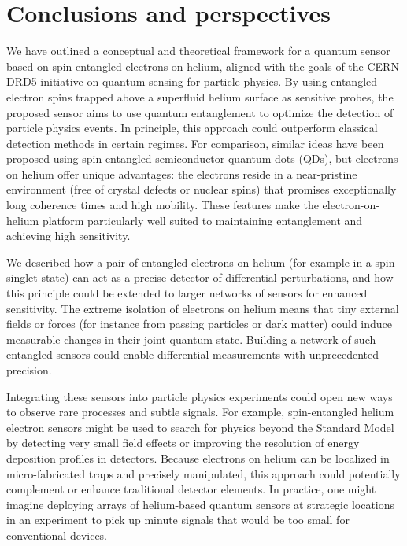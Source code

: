 \documentclass[fleqn,10pt]{wlscirep}
\begin{document}
\section{Conclusions and perspectives}

We have outlined a conceptual and theoretical framework for a quantum sensor based on spin-entangled electrons on helium, aligned with the goals of the CERN DRD5 initiative \cite{drd52024} on quantum sensing for particle physics. By using entangled electron spins trapped above a superfluid helium surface as sensitive probes, the proposed sensor aims to use quantum entanglement to optimize the detection of particle physics events. In principle, this approach could outperform classical detection methods in certain regimes.  For comparison, similar ideas have been proposed using spin-entangled semiconductor quantum dots (QDs), but electrons on helium offer unique advantages: the electrons reside in a near-pristine environment (free of crystal defects or nuclear spins) that promises exceptionally long coherence times and high mobility. These features make the electron-on-helium platform particularly well suited to maintaining entanglement and achieving high sensitivity.

We described how a pair of entangled electrons on helium (for example in a spin-singlet state) can act as a precise detector of differential perturbations, and how this principle could be extended to larger networks of sensors for enhanced sensitivity. The extreme isolation of electrons on helium means that tiny external fields or forces (for instance from passing particles or dark matter) could induce measurable changes in their joint quantum state. Building a network of such entangled sensors could enable differential measurements with unprecedented precision.

Integrating these sensors into particle physics experiments could open new ways to observe rare processes and subtle signals. For example, spin-entangled helium electron sensors might be used to search for physics beyond the Standard Model by detecting very small field effects or improving the resolution of energy deposition profiles in detectors. Because electrons on helium can be localized in micro-fabricated traps and precisely manipulated, this approach could potentially complement or enhance traditional detector elements. In practice, one might imagine deploying arrays of helium-based quantum sensors at strategic locations in an experiment to pick up minute signals that would be too small for conventional devices.
\end{document}
